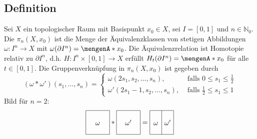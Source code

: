 \subsection[Definition: $n$-te absolute Homotopiegruppe]{Definition} %
\label{sub:1514}
Sei $X$ ein topologischer Raum mit Basispunkt $x_0 \in X$, sei $I=[0,1]$ und $n \in \mathds{N}_0$. Die 
$\pi_n(X,x_0)$ ist die Menge der Äquivalenzklassen von stetigen Abbildungen $\omega\colon I^n \to X$ mit $\omega(\partial I^n)=\set{x_0}$. Die Äquivalenzrelation ist 
Homotopie relativ zu $\partial I^n$, d.h. $H \colon I^n \times [0,1] \to X$ erfüllt $H_t(\partial I^n)= \set{x_0}$ für alle $t \in [0,1]$. Die Gruppenverknüpfung in 
$\pi_n(X,x_0)$ ist gegeben durch 
\[
	(\omega * \omega')(s_1,\ldots ,s_n) = \begin{cases}
		\omega(2s_1, s_2, \ldots ,s_n), &\text{ falls }0\le s_1 \le \frac{1}{2} \\
		\omega'(2s_1 -1, s_2, \ldots , s_n) ,&\text{ falls } \frac{1}{2} \le s_1 \le 1
	\end{cases}
\]
Bild für $n=2$:
\[	
	\vcenter{\hbox{\begin{tikzpicture}[scale=1.2]
		\draw (0,0) rectangle (1,1);
		\node at (0.5,0.5) {$\omega\vphantom{\omega^\prime}$};
	\end{tikzpicture}}}
	 * 
 	\vcenter{\hbox{\begin{tikzpicture}[,scale=1.2]
 		\draw (0,0) rectangle (1,1);
		\node at (0.5,0.5){$\omega^\prime$};
 	\end{tikzpicture}}}
	= 
	\vcenter{\hbox{\begin{tikzpicture}[scale=1.2]
		\draw (0,0) rectangle (1,1);
		\draw (0.5,0) -- (0.5,1);
		\node at (0.25,0.5) {$\omega\vphantom{\omega^\prime}$};
		\node at (0.75,0.5) {$\omega^\prime$};
	\end{tikzpicture}}}
\]

